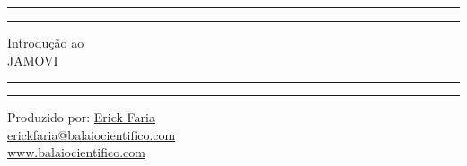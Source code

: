 \begin{titlepage}
	\centering %
	\scshape %
	\vspace*{1.5\baselineskip} %

	\rule{13cm}{1.6pt}\vspace*{-\baselineskip}\vspace*{2pt} %
	\rule{13cm}{0.4pt} %
	
		\vspace{0.75\baselineskip} %
	{	\Huge Introdução ao\\ 
			\vspace{4mm}
		JAMOVI \\	}
		\vspace{0.75\baselineskip} %
	\rule{13cm}{0.4pt}\vspace*{-\baselineskip}\vspace{3.2pt} %
	\rule{13cm}{1.6pt} %
	
		\vspace{1.75\baselineskip} %
	{\large Produzido por: \href{https://www.balaiocientifico.com/author/erickfaria/}{Erick Faria} \\
		\vspace*{1.2\baselineskip}
	\href{mailto:erickfaria@balaiocientifico.com}{erickfaria@balaiocientifico.com}} \\
	\vfill
\url{www.balaiocientifico.com}\\
\vspace{0.5cm}
\ccbyncsa
\end{titlepage}